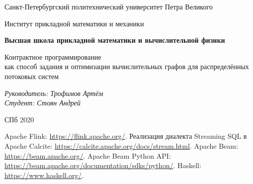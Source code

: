 \documentclass[a4paper,12pt]{article}
\begin{document}
\thispagestyle{empty}
\begin{center}
    Санкт-Петербургский политехнический университет Петра Великого

    Институт прикладной математики и механики

    \textbf{Высшая школа прикладной математики и вычислительной
    физики}
\end{center}
\vspace{13ex}

\begin{center}
    \vspace{16ex}
    \begin{spacing}{1.5}
        {\Large Контрактное программирование \\как способ задания и оптимизации вычислительных графов для распределённых потоковых систем}
    \end{spacing}
\end{center}
\vfill
\begin{flushright}
    \noindent
    \textit{Руководитель: Трофимов Артём} \\
    \textit{Студент: Стоян Андрей}
\end{flushright}
\vspace{5ex}
\begin{center}
    СПб 2020
\end{center}
\newpage

\tableofcontents
\newpage


\newpage

\newpage

\newpage

\newpage






\begin{thebibliography}{9}
     Apache Flink: \url{https://flink.apache.org/}.
     Реализация диалекта Streaming SQL в Apache Calcite: \url{https://calcite.apache.org/docs/stream.html}.
     Apache Beam: \url{https://beam.apache.org/}.
     Apache Beam Python API: \url{https://beam.apache.org/documentation/sdks/python/}.
     Haskell: \url{https://www.haskell.org/}.
\end{thebibliography}
\end{document}

